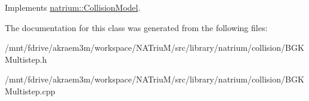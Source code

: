 Implements \hyperlink{classnatrium_1_1CollisionModel_a88b382d63da80e950bc58e8afad769a6}{natrium::CollisionModel}.

The documentation for this class was generated from the following files:\begin{DoxyCompactItemize}
\item 
/mnt/fdrive/akraem3m/workspace/NATriuM/src/library/natrium/collision/BGKMultistep.h\item 
/mnt/fdrive/akraem3m/workspace/NATriuM/src/library/natrium/collision/BGKMultistep.cpp\end{DoxyCompactItemize}

